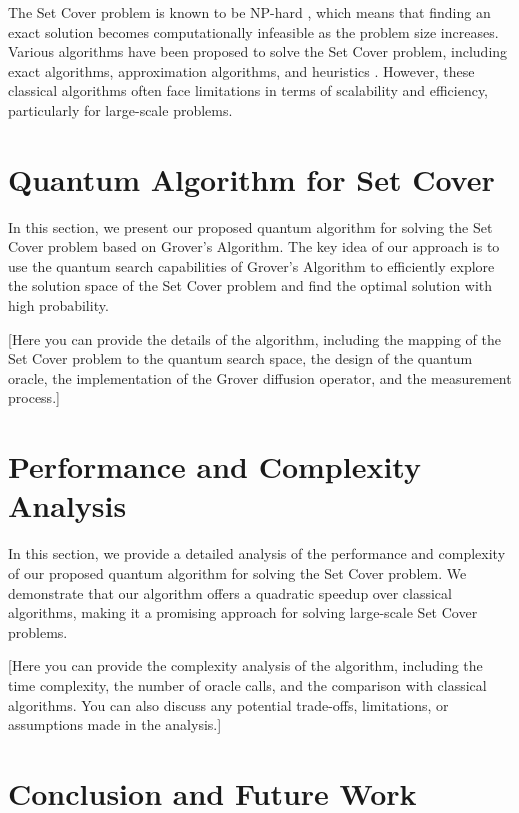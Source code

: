 The Set Cover problem is known to be NP-hard \cite{Karp1972}, which means that finding an exact solution becomes computationally infeasible as the problem size increases. Various algorithms have been proposed to solve the Set Cover problem, including exact algorithms, approximation algorithms, and heuristics \cite{Vazirani2001, Cormen2009}. However, these classical algorithms often face limitations in terms of scalability and efficiency, particularly for large-scale problems.

\section{Quantum Algorithm for Set Cover}
\label{sec:algorithm}

In this section, we present our proposed quantum algorithm for solving the Set Cover problem based on Grover's Algorithm. The key idea of our approach is to use the quantum search capabilities of Grover's Algorithm to efficiently explore the solution space of the Set Cover problem and find the optimal solution with high probability.

[Here you can provide the details of the algorithm, including the mapping of the Set Cover problem to the quantum search space, the design of the quantum oracle, the implementation of the Grover diffusion operator, and the measurement process.]

\section{Performance and Complexity Analysis}
\label{sec:analysis}

In this section, we provide a detailed analysis of the performance and complexity of our proposed quantum algorithm for solving the Set Cover problem. We demonstrate that our algorithm offers a quadratic speedup over classical algorithms, making it a promising approach for solving large-scale Set Cover problems.

[Here you can provide the complexity analysis of the algorithm, including the time complexity, the number of oracle calls, and the comparison with classical algorithms. You can also discuss any potential trade-offs, limitations, or assumptions made in the analysis.]

\section{Conclusion and Future Work}
\label{sec:conclusion}

